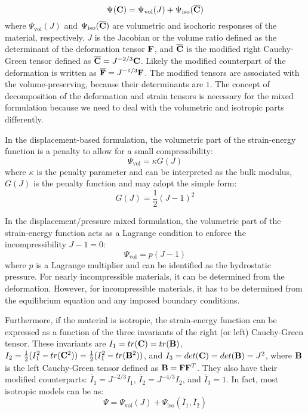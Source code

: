 \begin{equation} \label{energy_split}
\Psi(\bold{C}) = \Psi_\mathrm{vol}(J) + \Psi_\mathrm{iso}(\overline{\bold{C}})
\end{equation}
where $\Psi_\mathrm{vol}(J)$ and $\Psi_\mathrm{iso}(\overline{\bold{C}})$ are volumetric and isochoric responses of the material, respectively. $J$ is the Jacobian or the volume ratio defined as the determinant of the deformation tensor $\bold{F}$, and $\overline{\bold{C}}$ is the modified right Cauchy-Green tensor defined as 
$\overline{\bold{C}}  = J^{-2/3} \bold{C}$. Likely the modified counterpart of the deformation is written as $\overline{\bold{F}} = J^{-1/3} \bold{F}$. The modified tensors are associated with the volume-preserving, because their determinants are $1$. The concept of decomposition of the deformation and strain tensors is necessary for the mixed formulation because we need to deal with the volumetric and isotropic parts differently.

In the displacement-based formulation, the volumetric part of the strain-energy function is a penalty to allow for a small compressibility:
\begin{equation} \label{penalty}
\Psi_\mathrm{vol} = \kappa G(J)
\end{equation}
where $\kappa$ is the penalty parameter and can be interpreted as the bulk modulus, $G(J)$ is the penalty function and may adopt the simple form:
\begin{equation} \label{penalty2}
G(J) = \frac{1}{2}(J - 1)^2
\end{equation}

In the displacement/pressure mixed formulation, the volumetric part of the strain-energy function acts as a Lagrange condition to enforce the incompressibility $J -1 = 0$:
\begin{equation} \label{Lagrange}
\Psi_\mathrm{vol} = p(J-1)
\end{equation}
where $p$ is a Lagrange multiplier and can be identified as the hydrostatic pressure. For nearly incompressible materials, it can be determined from the deformation. However, for incompressible materials, it has to be determined from the equilibrium equation and any imposed boundary conditions. 

Furthermore, if the material is isotropic, the strain-energy function can be expressed as a function of the three invariants of the right (or left) Cauchy-Green tensor. 
These invariants are 
$I_1 = tr(\bold{C}) = tr(\bold{B})$, $I_2 = \frac{1}{2}(I_1^2 - tr(\bold{C}^2)) = \frac{1}{2}(I_1^2 - tr(\bold{B}^2))$, and $I_3 = det(\bold{C}) = det(\bold{B}) = J^2$, where $\bold{B}$ is the left Cauchy-Green tensor defined as $\bold{B} = \bold{F}{\bold{F}}^T$. 
They also have their modified counterparts: $\bar{I}_1 = J^{-2/3}I_1$, $\bar{I}_2 = J^{-4/3}I_2$, and $\bar{I}_3 = 1$. In fact, most isotropic models can be as:
\begin{equation}
\Psi = \Psi_\mathrm{vol}(J) + \Psi_\mathrm{iso}(\bar{I}_1, \bar{I}_2)
\end{equation}


